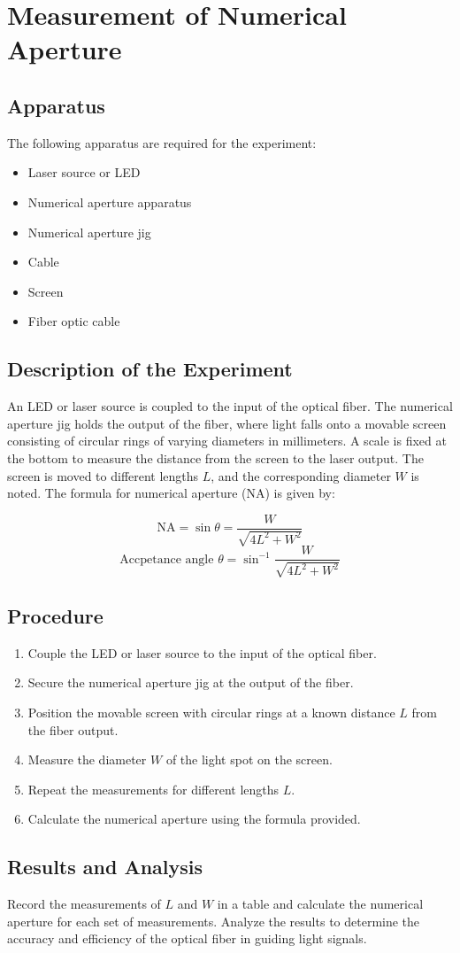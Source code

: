\documentclass{article}
\theoremstyle{mytheoremstyle}
\theoremstyle{mytheoremstyle}
\theoremstyle{myproblemstyle}
\begin{document}
\section{Measurement of Numerical Aperture}


\subsection{Apparatus}

The following apparatus are required for the experiment:
\begin{itemize}
    \item Laser source or LED
    \item Numerical aperture apparatus
    \item Numerical aperture jig
    \item Cable
    \item Screen
    \item Fiber optic cable
\end{itemize}

\subsection{Description of the Experiment}

An LED or laser source is coupled to the input of the optical fiber. The numerical aperture jig holds the output of the fiber, where light falls onto a movable screen consisting of circular rings of varying diameters in millimeters. A scale is fixed at the bottom to measure the distance from the screen to the laser output. The screen is moved to different lengths \(L\), and the corresponding diameter \(W\) is noted. The formula for numerical aperture (NA) is given by:

\[
\text{NA} = \sin \theta = \frac{W}{\sqrt{4L^2 + W^2}}
\]
\[
  \text{Accpetance angle } \theta = \sin^{-1}\frac{W}{\sqrt{4L^2 + W^2}}
\]

\subsection{Procedure}

\begin{enumerate}
    \item Couple the LED or laser source to the input of the optical fiber.
    \item Secure the numerical aperture jig at the output of the fiber.
    \item Position the movable screen with circular rings at a known distance \(L\) from the fiber output.
    \item Measure the diameter \(W\) of the light spot on the screen.
    \item Repeat the measurements for different lengths \(L\).
    \item Calculate the numerical aperture using the formula provided.
\end{enumerate}

\subsection{Results and Analysis}

Record the measurements of \(L\) and \(W\) in a table and calculate the numerical aperture for each set of measurements. Analyze the results to determine the accuracy and efficiency of the optical fiber in guiding light signals.
\end{document}
